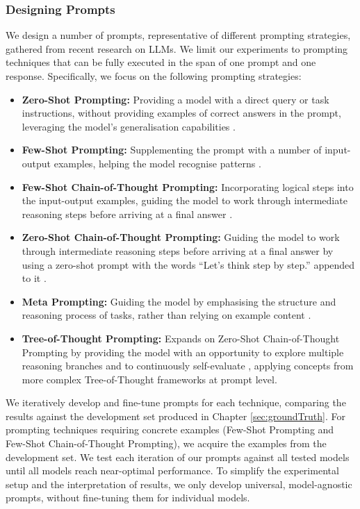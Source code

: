 \documentclass{article}
\begin{document}
\subsubsection{Designing Prompts}

We design a number of prompts, representative of different prompting strategies, gathered from recent research on LLMs. We limit our experiments to prompting techniques that can be fully executed in the span of one prompt and one response. Specifically, we focus on the following prompting strategies:

\begin{itemize}
    \item \textbf{Zero-Shot Prompting:} Providing a model with a direct query or task instructions, without providing examples of correct answers in the prompt, leveraging the model's generalisation capabilities \cite{DBLP:conf/nips/KojimaGRMI22}.
    \item \textbf{Few-Shot Prompting:} Supplementing the prompt with a number of input-output examples, helping the model recognise patterns \cite{DBLP:conf/nips/BrownMRSKDNSSAA20}.
    \item \textbf{Few-Shot Chain-of-Thought Prompting:} Incorporating logical steps into the input-output examples, guiding the model to work through intermediate reasoning steps before arriving at a final answer \cite{DBLP:conf/nips/Wei0SBIXCLZ22}.
    \item \textbf{Zero-Shot Chain-of-Thought Prompting:} Guiding the model to work through intermediate reasoning steps before arriving at a final answer by using a zero-shot prompt with the words “Let's think step by step.” appended to it \cite{DBLP:conf/nips/KojimaGRMI22}.
    \item \textbf{Meta Prompting:} Guiding the model by emphasising the structure and reasoning process of tasks, rather than relying on example content \cite{zhang2025metapromptingaisystems}.
    \item \textbf{Tree-of-Thought Prompting:} Expands on Zero-Shot Chain-of-Thought Prompting by providing the model with an opportunity to explore multiple reasoning branches and to continuously self-evaluate \cite{tree-of-thought-prompting}, applying concepts from more complex Tree-of-Thought frameworks \cites{DBLP:journals/corr/abs-2305-08291}{DBLP:conf/nips/YaoYZS00N23} at prompt level.
\end{itemize}

We iteratively develop and fine-tune prompts for each technique, comparing the results against the development set produced in Chapter \ref{sec:groundTruth}. For prompting techniques requiring concrete examples (Few-Shot Prompting and Few-Shot Chain-of-Thought Prompting), we acquire the examples from the development set. We test each iteration of our prompts against all tested models until all models reach near-optimal performance. To simplify the experimental setup and the interpretation of results, we only develop universal, model-agnostic prompts, without fine-tuning them for individual models.
\end{document}
